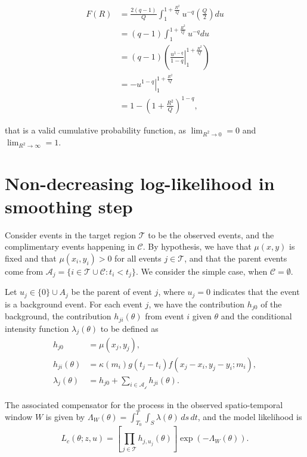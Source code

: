 \begin{align*}
  F(R) &= \frac{2(q - 1)}{Q}\int_{1}^{1 + \frac{R^{2}}{Q}}u^{-q}\left(\frac{Q}{2}\right)du \\
       &= (q - 1)\int_{1}^{1 + \frac{R^{2}}{Q}}u^{-q}du \\
       &= (q - 1)\left(\left. \frac{u^{1 - q}}{1 - q}\right|_{1}^{1 + \frac{R^{2}}{Q}}\right) \\
       &= \left. -u^{1 - q}\right|_{1}^{1 + \frac{R^{2}}{Q}} \\
       &= 1 - \left(1 + \frac{R^{2}}{Q}\right)^{1 - q},
\end{align*}

\noindent that is a valid cumulative probability function, as $\lim_{R^{2} \to 0} = 0$ and $\lim_{R^{2} \to \infty} = 1$.

\chapter{Non-decreasing log-likelihood in smoothing step}
\label{append-non-decreasing}

Consider events in the target region $\mathcal{T}$ to be the observed events, and the complimentary events happening in $\mathcal{C}$. By hypothesis, we have that $\mu(x,y)$ is fixed and that $\mu(x_{i},y_{i}) > 0$ for all events $j \in \mathcal{T}$, and that the parent events come from $\mathcal{A}_{j} = \{i \in \mathcal{T} \cup \mathcal{C} : t_{i} < t_{j}\}$. We consider the simple case, when $\mathcal{C} = \emptyset$.

Let $u_{j} \in \{0\} \cup A_{j}$ be the parent of event $j$, where $u_{j} = 0$ indicates that the event is a background event. For each event $j$, we have the contribution $h_{j0}$ of the background, the contribution $h_{ji}(\theta)$ from event $i$ given $\theta$ and the conditional intensity function $\lambda_{j}(\theta)$ to be defined as
\begin{align*}
  h_{j0} &= \mu(x_{j},y_{j}), \\
  h_{ji}(\theta) &= \kappa(m_{i})g(t_{j} - t_{i})f(x_{j} - x_{i}, y_{j} - y_{i};m_{i}), \\
  \lambda_{j}(\theta) &= h_{j0} + \sum_{i \in \mathcal{A_{j}}}h_{ji}(\theta).
\end{align*}

The associated compensator for the process in the observed spatio-temporal window $W$ is given by $\Lambda_{W}(\theta) = \int_{T_{0}}^{T}\int_{S}\lambda(\theta)\, ds \, dt$, and the model likelihood is
\begin{equation}
  \label{eq-likelihood-hj}
  L_{c}(\theta;z,u) = \left[\prod_{j \in \mathcal{T}}h_{j,u_{j}}(\theta)\right]\exp\left(-\Lambda_{W}(\theta)\right).
\end{equation}

